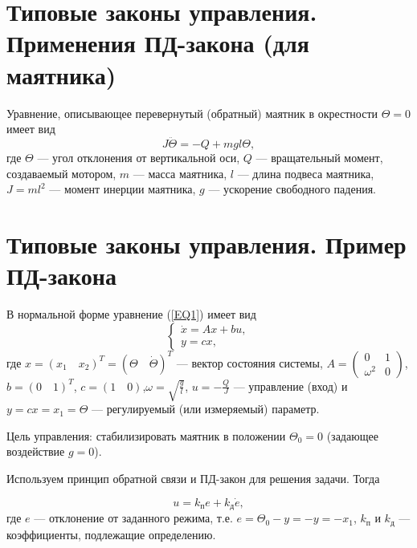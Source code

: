 \documentclass[../TAU.tex]{subfiles}
\theoremstyle{plain}
\theoremstyle{definition}
\theoremstyle{remark}
\theoremstyle{plain}
\newcommand{\eref}[1]{(\ref{#1})}
\begin{document}
\section{Типовые законы управления. Применения ПД-закона (для маятника)}

\begin{center}
\end{center}

Уравнение, описывающее перевернутый (обратный) маятник в окрестности $\Theta=0$ имеет вид
\begin{equation}\label{EQ1}
J\ddot\Theta = -Q+mgl\Theta,
\end{equation}
где $\Theta$ --- угол отклонения от вертикальной оси, $Q$ --- вращательный момент, создаваемый мотором, $m$ --- масса маятника, $l$ --- длина подвеса
маятника, $J = ml^2$ --- момент инерции маятника, $g$ --- ускорение свободного падения.




\section{Типовые законы управления. Пример ПД-закона}

В нормальной форме уравнение \eref{EQ1} имеет вид
\begin{equation}\label{EQ1NORM}
\begin{cases}
\dot x = Ax + bu,\\
y = c x,
\end{cases}
\end{equation}
где $x = (x_1\quad x_2)^T = ( \Theta\quad \dot\Theta)^T$ --- вектор состояния системы, $A =\begin{pmatrix}0 & 1\\ \omega^2& 0\end{pmatrix}$,$b = (0\quad 1)^T$, $c = (1\quad0)$,$\omega = \sqrt{\frac{g}{l}}$, $u = -\frac{Q}{J}$ --- управление (вход) и $y = cx = x_1 = \Theta$ --- регулируемый (или измеряемый) параметр.

Цель управления: стабилизировать маятник в положении $\Theta_0 = 0$ (задающее воздействие $g = 0$).

Используем принцип обратной связи и ПД-закон для решения задачи. Тогда


$$
u = k_п e + k_д \dot e,
$$
где $e$ --- отклонение от заданного режима, т.е. $e = \Theta_0 - y = -y = -x_1$, $k_п$ и $k_д$ --- коэффициенты, подлежащие определению.
\end{document}
